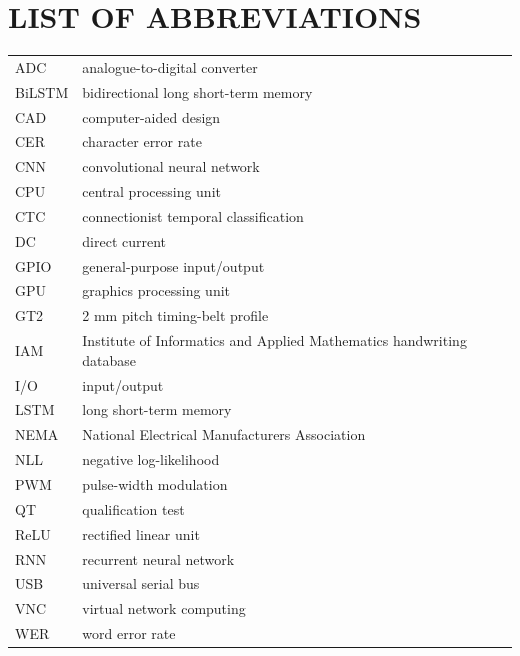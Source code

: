 \section*{LIST OF ABBREVIATIONS}
\begin{tabular}{p{3cm}p{10cm}}
ADC & analogue-to-digital converter\\
BiLSTM & bidirectional long short-term memory\\
CAD & computer-aided design\\
CER & character error rate\\
CNN & convolutional neural network\\
CPU & central processing unit\\
CTC & connectionist temporal classification\\
DC & direct current\\
GPIO & general-purpose input/output\\
GPU & graphics processing unit\\
GT2 & 2 mm pitch timing-belt profile\\
IAM & Institute of Informatics and Applied Mathematics handwriting database\\
I/O & input/output\\
LSTM & long short-term memory\\
NEMA & National Electrical Manufacturers Association\\
NLL & negative log-likelihood\\
PWM & pulse-width modulation\\
QT & qualification test\\
ReLU & rectified linear unit\\
RNN & recurrent neural network\\
USB & universal serial bus\\
VNC & virtual network computing\\
WER & word error rate\\
\end{tabular}
